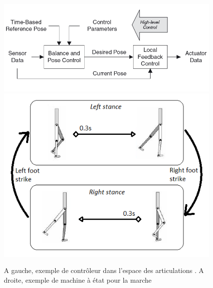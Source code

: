 \documentclass[runningheads,a4paper]{llncs}
\begin{document}
\begin{figure}[h]
\centering
\includegraphics[scale=0.4]{joint_space_motion_control.png}
\includegraphics[scale=0.5]{state_machine.png}
\caption{A gauche, exemple de contrôleur dans l'espace des articulations \cite{geijtenbeek2012interactive}. A droite, exemple de machine à état pour la marche \cite{yin2007simbicon}}
\label{fig:joint_space_motion_control}
\label{fig:state_machine}
\end{figure}
\end{document}
